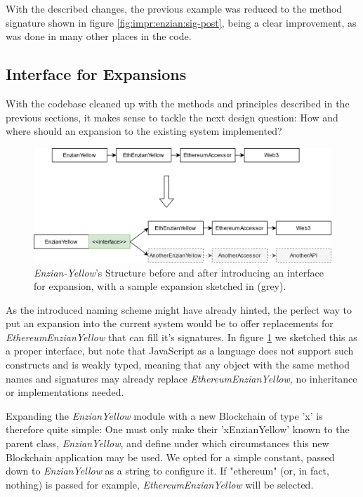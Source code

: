 With the described changes, the previous example was reduced to the method signature shown in figure \ref{fig:impr:enzian:sig-post}, being a clear improvement, as was done in many other places in the code.

\subsection{Interface for Expansions}
\label{sec:impr:enzian:exp}

With the codebase cleaned up with the methods and principles described in the previous sections, it makes sense to tackle the next design question: How and where should an expansion to the existing system implemented?

\begin{figure}[h]
	\centering
	\captionsetup{justification=centering,margin=2cm}
	\includegraphics[width=\textwidth]{gfx/enzian-expansion}
	\caption{\emph{Enzian-Yellow}'s Structure before and after introducing an interface for expansion, with a sample expansion sketched in (grey).}
	\label{fig:impr:enzian:expansion}
\end{figure}

As the introduced naming scheme might have already hinted, the perfect way to put an expansion into the current system would be to offer replacements for \emph{EthereumEnzianYellow} that can fill it's signatures. In figure \ref{fig:impr:enzian:expansion} we sketched this as a proper interface, but note that JavaScript as a language does not support such constructs and is weakly typed, meaning that any object with the same method names and signatures may already replace \emph{EthereumEnzianYellow}, no inheritance or implementations needed.

Expanding the \emph{EnzianYellow} module with a new Blockchain of type 'x' is therefore quite simple: One must only make their 'xEnzianYellow' known to the parent class, \emph{EnzianYellow}, and define under which circumstances this new Blockchain application may be used. We opted for a simple constant, passed down to \emph{EnzianYellow} as a string to configure it. If "ethereum" (or, in fact, nothing) is passed for example, \emph{EthereumEnzianYellow} will be selected.

